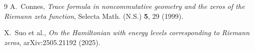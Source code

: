\documentclass[aps,prx,reprint,floatfix]{revtex4-2}
\begin{document}
\begin{thebibliography}{9}
 A.~Connes,
  \emph{Trace formula in noncommutative geometry and the zeros of the Riemann zeta function},
  Selecta Math. (N.S.) \textbf{5}, 29 (1999).

 X.~Suo et al.,
  \emph{On the Hamiltonian with energy levels corresponding to Riemann zeros},
  arXiv:2505.21192 (2025).

\end{thebibliography}
\end{document}
